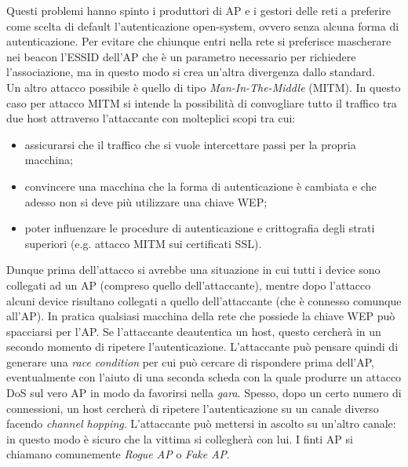 Questi problemi hanno spinto i produttori di AP e i gestori delle reti a preferire come scelta di default l'autenticazione open-system, ovvero senza alcuna forma di autenticazione. Per evitare che chiunque entri nella rete si preferisce mascherare nei beacon l'ESSID dell'AP che è un parametro necessario per richiedere l'associazione, ma in questo modo si crea un'altra divergenza dallo standard.\\

Un altro attacco possibile è quello di tipo \textit{Man-In-The-Middle} (MITM). In questo caso per attacco MITM si intende la possibilità di convogliare tutto il traffico tra due host attraverso l'attaccante con molteplici scopi tra cui:
\begin{itemize}
	\item assicurarsi che il traffico che si vuole intercettare passi per la propria macchina;
	\item convincere una macchina che la forma di autenticazione è cambiata e che adesso non si deve più utilizzare una chiave WEP;
	\item poter influenzare le procedure di autenticazione e crittografia degli strati superiori (e.g. attacco MITM sui certificati SSL).
\end{itemize}
Dunque prima dell'attacco si avrebbe una situazione in cui tutti i device sono collegati ad un AP (compreso quello dell'attaccante), mentre dopo l'attacco alcuni device risultano collegati a quello dell'attaccante (che è connesso comunque all'AP). In pratica qualsiasi macchina della rete che possiede la chiave WEP può spacciarsi per l'AP. Se l'attaccante deautentica un host, questo cercherà in un secondo momento di ripetere l'autenticazione. L'attaccante può pensare quindi di generare una \textit{race condition} per cui può cercare di rispondere prima dell'AP, eventualmente con l'aiuto di una seconda scheda con la quale produrre un attacco DoS sul vero AP in modo da favorirsi nella \textit{gara}. Spesso, dopo un certo numero di connessioni, un host cercherà di ripetere l'autenticazione su un canale diverso facendo \textit{channel hopping}. L'attaccante può mettersi in ascolto su un'altro canale: in questo modo è sicuro che la vittima si collegherà con lui. I finti AP si chiamano comunemente \textit{Rogue AP} o \textit{Fake AP}.

